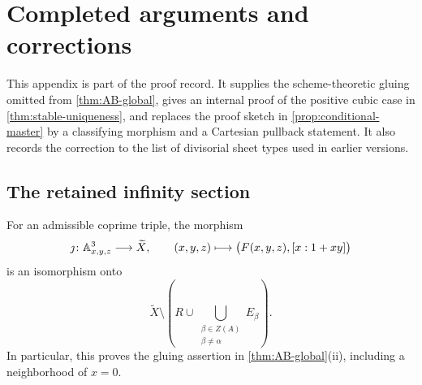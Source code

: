 \section{Completed arguments and corrections}
\label{app:audit-repairs}

This appendix is part of the proof record.  It supplies the scheme-theoretic
gluing omitted from \cref{thm:AB-global}, gives an internal proof of the
positive cubic case in \cref{thm:stable-uniqueness}, and replaces the proof
sketch in \cref{prop:conditional-master} by a classifying morphism and a
Cartesian pullback statement.  It also records the correction to the list of
divisorial sheet types used in earlier versions.

\subsection{The retained infinity section}

\begin{lemma}
\label{lem:retained-infinity-gluing}
For an admissible coprime triple, the morphism
\[
\jmath\colon\mathbb A^3_{x,y,z}\longrightarrow\widetilde X,
\qquad
(x,y,z)\longmapsto
\bigl(F(x,y,z),[x:1+xy]\bigr)
\]
is an isomorphism onto
\[
\widetilde X\setminus
\left(R\cup\bigcup_{\substack{\beta\in Z(A)\\\beta\ne\alpha}}E_\beta\right).
\]
In particular, this proves the gluing assertion in
\cref{thm:AB-global}(ii), including a neighborhood of \(x=0\).
\end{lemma}

